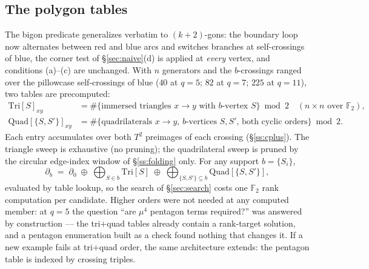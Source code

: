 \documentclass[11pt,reqno]{amsart}
\theoremstyle{plain}
\theoremstyle{definition}
\newcommand{\F}{\mathbb{F}}
\newcommand{\bc}{b}
\begin{document}
\subsection{The polygon tables}\label{ss:tables}
The bigon predicate generalizes verbatim to $(k{+}2)$-gons: the boundary loop now alternates
between red and blue arcs and switches branches at self-crossings of blue, the corner test of
\S\ref{sec:naive}(d) is applied at \emph{every} vertex, and conditions (a)--(c) are unchanged.
With $n$ generators and the $\bc$-crossings
ranged over the pillowcase self-crossings of blue ($40$ at $q=5$; $82$ at $q=7$; $225$ at
$q=11$), two tables are precomputed:
\begin{align*}
\mathrm{Tri}[S]_{xy}&=\#\{\text{immersed triangles }x\to y\text{ with }\bc\text{-vertex }S\}
\bmod 2\quad (n\times n\text{ over }\F_2),\\
\mathrm{Quad}[\{S,S'\}]_{xy}&=\#\{\text{quadrilaterals }x\to y\text{, }\bc\text{-vertices }
S,S'\text{, both cyclic orders}\}\bmod 2.
\end{align*}
Each entry accumulates over both $T^2$ preimages of each crossing (\S\ref{ss:cplus}). The
triangle sweep is exhaustive (no pruning); the quadrilateral sweep is pruned by the circular
edge-index window of \S\ref{ss:folding} only. For any support $\bc=\{S_i\}$,
\[
   \partial_\bc \;=\; \partial_0
   \;\oplus\;\bigoplus_{S\in\bc}\mathrm{Tri}[S]
   \;\oplus\;\bigoplus_{\{S,S'\}\subseteq\bc}\mathrm{Quad}[\{S,S'\}] ,
\]
evaluated by table lookup, so the search of \S\ref{sec:search} costs one $\F_2$ rank
computation per candidate. Higher orders were not needed at any computed member: at $q=5$ the
question ``are $\mu^4$ pentagon terms required?'' was answered by construction --- the
tri$+$quad tables already contain a rank-target solution, and a pentagon enumeration built as
a check found nothing that changes it. If a new example fails at tri$+$quad order, the same
architecture extends: the pentagon table is indexed by crossing triples.
\end{document}

